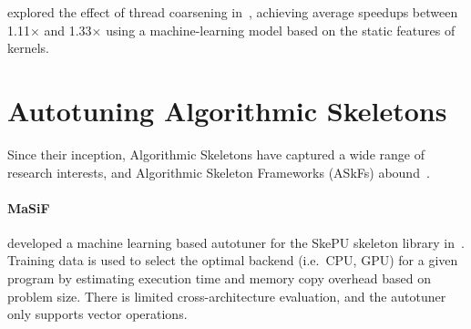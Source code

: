 \citeauthor{Magni2014} explored the effect of thread coarsening
in~\cite{Magni2014}, achieving average speedups between 1.11$\times$
and 1.33$\times$ using a machine-learning model based on the static
features of kernels.



\section{Autotuning Algorithmic Skeletons}


Since their inception, Algorithmic Skeletons have captured a wide
range of research interests, and Algorithmic Skeleton Frameworks
(ASkFs) abound~\cite{Gonz2010}.



%
\paragraph{MaSiF} 


\citeauthor{Dastgeer2011} developed a machine learning based autotuner
for the SkePU skeleton library in~\cite{Dastgeer2011}. Training data
is used to select the optimal backend (i.e.\ CPU, GPU) for a given
program by estimating execution time and memory copy overhead based on
problem size. There is limited cross-architecture evaluation, and the
autotuner only supports vector operations.

